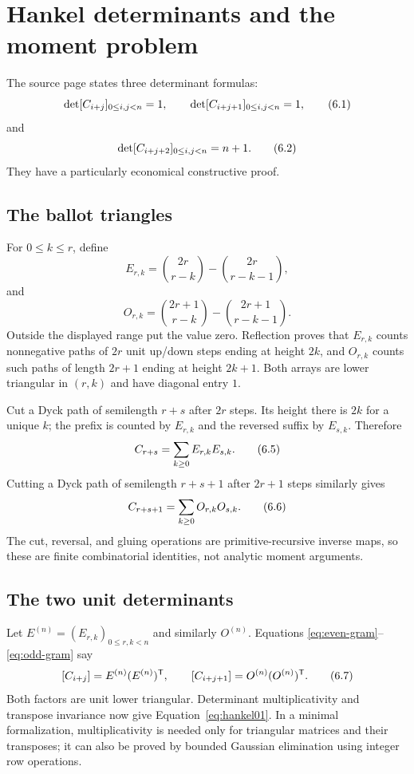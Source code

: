 \section{Hankel determinants and the moment problem}
\label{sec:hankel}

The source page states three determinant formulas:
\[
 \det[C_{i+j}]_{0\le i,j<n}=1,
 \qquad
 \det[C_{i+j+1}]_{0\le i,j<n}=1,                              \tag{6.1}\label{eq:hankel01}
\]
and
\[
 \det[C_{i+j+2}]_{0\le i,j<n}=n+1.                           \tag{6.2}\label{eq:hankel2}
\]
They have a particularly economical constructive proof.

\subsection{The ballot triangles}

For $0\le k\le r$, define
\[
 E_{r,k}=\binom{2r}{r-k}-\binom{2r}{r-k-1},                      \tag{6.3}\label{eq:even-ballot}
\]
and
\[
 O_{r,k}=\binom{2r+1}{r-k}-\binom{2r+1}{r-k-1}.                  \tag{6.4}\label{eq:odd-ballot}
\]
Outside the displayed range put the value zero.  Reflection proves that
$E_{r,k}$ counts nonnegative paths of $2r$ unit up/down steps ending at height
$2k$, and $O_{r,k}$ counts such paths of length $2r+1$ ending at height
$2k+1$.  Both arrays are lower triangular in $(r,k)$ and have diagonal entry
$1$.

Cut a Dyck path of semilength $r+s$ after $2r$ steps.  Its height there is
$2k$ for a unique $k$; the prefix is counted by $E_{r,k}$ and the reversed
suffix by $E_{s,k}$.  Therefore
\[
 C_{r+s}=\sum_{k\ge0}E_{r,k}E_{s,k}.                          \tag{6.5}\label{eq:even-gram}
\]
Cutting a Dyck path of semilength $r+s+1$ after $2r+1$ steps similarly gives
\[
 C_{r+s+1}=\sum_{k\ge0}O_{r,k}O_{s,k}.                        \tag{6.6}\label{eq:odd-gram}
\]
The cut, reversal, and gluing operations are primitive-recursive inverse maps,
so these are finite combinatorial identities, not analytic moment arguments.

\subsection{The two unit determinants}

Let $E^{(n)}=(E_{r,k})_{0\le r,k<n}$ and similarly $O^{(n)}$.  Equations
\eqref{eq:even-gram}--\eqref{eq:odd-gram} say
\[
 [C_{i+j}]=E^{(n)}(E^{(n)})^{\mathsf T},
 \qquad
 [C_{i+j+1}]=O^{(n)}(O^{(n)})^{\mathsf T}.                    \tag{6.7}
\]
Both factors are unit lower triangular.  Determinant multiplicativity and
transpose invariance now give Equation~\eqref{eq:hankel01}.  In a minimal
formalization, multiplicativity is needed only for triangular matrices and
their transposes; it can also be proved by bounded Gaussian elimination using
integer row operations.

